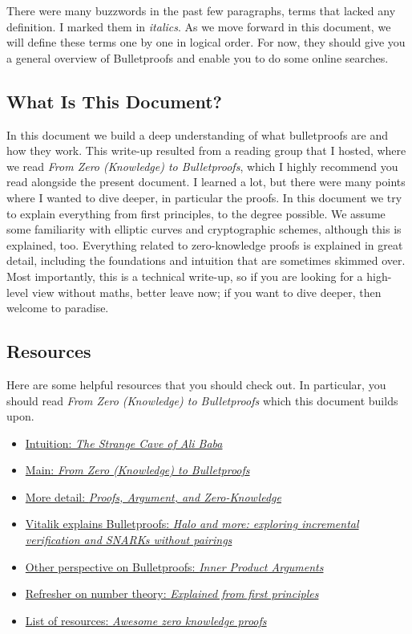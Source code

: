 There were many buzzwords in the past few paragraphs,
terms that lacked any definition.
I marked them in \emph{italics}.
As we move forward in this document,
we will define these terms one by one in logical order.
For now,
they should give you a general overview of Bulletproofs and enable you to do some online searches.

\subsection{What Is This Document?}

In this document we build a deep understanding of what bulletproofs are and how they work.
This write-up resulted from a reading group that I hosted,
where we read \emph{From Zero (Knowledge) to Bulletproofs},
which I highly recommend you read alongside the present document.
I learned a lot, but there were many points where I wanted to dive deeper, in particular the proofs.
In this document we try to explain everything from first principles, to the degree possible.
We assume some familiarity with elliptic curves and cryptographic schemes,
although this is explained, too.
Everything related to zero-knowledge proofs is explained in great detail,
including the foundations and intuition that are sometimes skimmed over.
Most importantly,
this is a technical write-up,
so if you are looking for a high-level view without maths, better leave now;
if you want to dive deeper, then welcome to paradise.

\subsection{Resources}

Here are some helpful resources that you should check out.
In particular,
you should read \emph{From Zero (Knowledge) to Bulletproofs} which this document builds upon.

\begin{itemize}
    \item \href{https://pages.cs.wisc.edu/~mkowalcz/628.pdf}{Intuition: \emph{The Strange Cave of Ali Baba}}
    \item \href{https://github.com/AdamISZ/from0k2bp}{Main: \emph{From Zero (Knowledge) to Bulletproofs}}
    \item \href{https://people.cs.georgetown.edu/jthaler/ProofsArgsAndZK.html}{More detail: \emph{Proofs, Argument, and Zero-Knowledge}}
    \item \href{https://vitalik.ca/general/2021/11/05/halo.html}{Vitalik explains Bulletproofs: \emph{Halo and more: exploring incremental verification and SNARKs without pairings}}
    \item \href{https://dankradfeist.de/ethereum/2021/07/27/inner-product-arguments.html}{Other perspective on Bulletproofs: \emph{Inner Product Arguments}}
    \item \href{https://explained-from-first-principles.com/number-theory/}{Refresher on number theory: \emph{Explained from first principles}}
    \item \href{https://github.com/matter-labs/awesome-zero-knowledge-proofs}{List of resources: \emph{Awesome zero knowledge proofs}}
\end{itemize}

